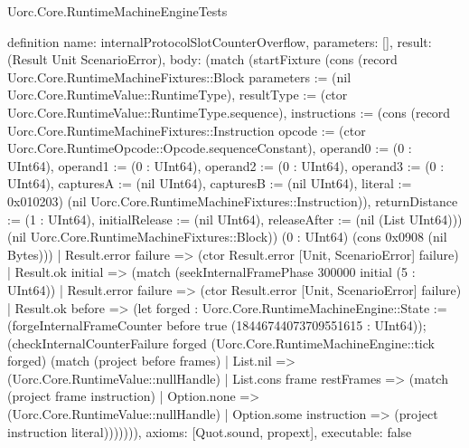 \begin{lexlean}{Uorc.Core.RuntimeMachineEngineTests}
\begin{semanticmodule}
definition{
  name: internalProtocolSlotCounterOverflow,
  parameters: [],
  result: (Result Unit ScenarioError),
  body: (match (startFixture (cons (record Uorc.Core.RuntimeMachineFixtures::Block {parameters := (nil Uorc.Core.RuntimeValue::RuntimeType), resultType := (ctor Uorc.Core.RuntimeValue::RuntimeType.sequence), instructions := (cons (record Uorc.Core.RuntimeMachineFixtures::Instruction {opcode := (ctor Uorc.Core.RuntimeOpcode::Opcode.sequenceConstant), operand0 := (0 : UInt64), operand1 := (0 : UInt64), operand2 := (0 : UInt64), operand3 := (0 : UInt64), capturesA := (nil UInt64), capturesB := (nil UInt64), literal := 0x010203}) (nil Uorc.Core.RuntimeMachineFixtures::Instruction)), returnDistance := (1 : UInt64), initialRelease := (nil UInt64), releaseAfter := (nil (List UInt64))}) (nil Uorc.Core.RuntimeMachineFixtures::Block)) (0 : UInt64) (cons 0x0908 (nil Bytes)))
    | Result.error failure => (ctor Result.error [Unit, ScenarioError] failure)
    | Result.ok initial => (match (seekInternalFramePhase 300000 initial (5 : UInt64))
      | Result.error failure => (ctor Result.error [Unit, ScenarioError] failure)
      | Result.ok before => (let forged : Uorc.Core.RuntimeMachineEngine::State := (forgeInternalFrameCounter before true (18446744073709551615 : UInt64)); (checkInternalCounterFailure forged (Uorc.Core.RuntimeMachineEngine::tick forged) (match (project before frames)
        | List.nil => (Uorc.Core.RuntimeValue::nullHandle)
        | List.cons frame restFrames => (match (project frame instruction)
          | Option.none => (Uorc.Core.RuntimeValue::nullHandle)
          | Option.some instruction => (project instruction literal))))))),
  axioms: [Quot.sound, propext],
  executable: false
}


\end{semanticmodule}
\end{lexlean}
